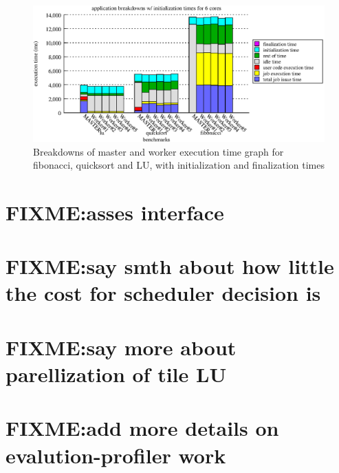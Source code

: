 \begin{figure}[!ht]
\includegraphics[width=\columnwidth]{figures/app_breakdowns_w_init}
\caption{Breakdowns of master and worker execution time graph for fibonacci, quicksort and LU, with initialization
and finalization times}
\label{fig:app_breakdowns_w_init}
\end{figure}


\section{FIXME:asses interface}
\section{FIXME:say smth about how little the cost for scheduler decision is}
\section{FIXME:say more about parellization of tile LU}
\section{FIXME:add more details on evalution-profiler work}

